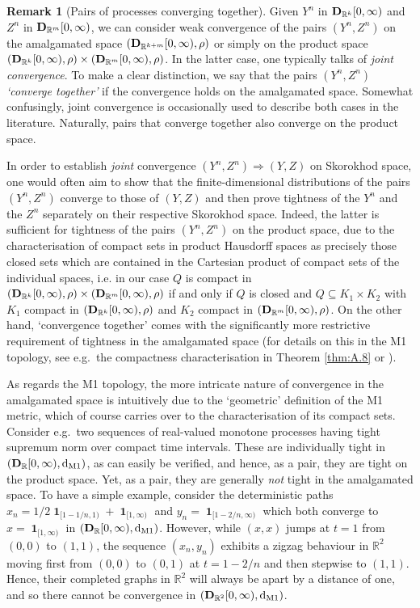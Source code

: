 \documentclass[11pt]{article}
\theoremstyle{definition}\newtheorem{example}[theorem]{Example}
\theoremstyle{definition}\newtheorem{counterexample}[theorem]{Counterexample}
\theoremstyle{definition}\newtheorem{remark}[theorem]{Remark}
\theoremstyle{definition}\newtheorem{defi}[theorem]{Definition}
\numberwithin{equation}{section}
\newcommand{\R}{\mathbb{R}}
\newcommand{\D}{{\bf D}}											%
\newcommand*\diff{\mathop{}\!\mathrm{d}}								%
\newcommand{\ind}{\operatorname{\mathbf{1}}}							%
\renewcommand{\|}{\; : \, \;}											%
\newcommand{\dM}{\diff_{\operatorname{M1}}}							%
\begin{document}
\begin{remark}[Pairs of processes converging together] Given $Y^n$ in $\D_{\mathbb{R}^k}[0,\infty) $ and $Z^n$ in $\D_{\mathbb{R}^m}[0,\infty)$, we can consider weak convergence of the pairs $(Y^n,Z^n)$ on the amalgamated space $(\D_{\mathbb{R}^{k+m}}[0,\infty),\rho)$ or simply on the product space $(\D_{\mathbb{R}^{k}}[0,\infty),\rho) \times (\D_{\mathbb{R}^{m}}[0,\infty),\rho)$. In the latter case, one typically talks of \emph{joint convergence}. To make a clear distinction, we say that the pairs $(Y^n,Z^n)$ \emph{`converge together'} if the convergence holds on the amalgamated space. Somewhat confusingly, joint convergence is occasionally used to describe both cases in the literature. Naturally, pairs that converge together also converge on the product space.
	
	
\end{remark}

In order to establish \emph{joint} convergence $(Y^n,Z^n) \Rightarrow (Y,Z)$ on Skorokhod space, one would often aim to show that the finite-dimensional distributions of the pairs $(Y^n,Z^n)$ converge to those of $(Y,Z)$ and then prove tightness of the $Y^n$ and the $Z^n$ separately on their respective Skorokhod space. Indeed, the latter is sufficient for tightness of the pairs $(Y^n, Z^n)$ on the product space, due to the characterisation of compact sets in product Hausdorff spaces as precisely those closed sets which are contained in the Cartesian product of compact sets of the individual spaces, i.e. in our case $Q$ is compact in $(\D_{\mathbb{R}^{k}}[0,\infty),\rho) \times (\D_{\mathbb{R}^{m}}[0,\infty),\rho)$ if and only if $Q$ is closed and $Q\subseteq K_1 \times K_2$ with $K_1$ compact in $(\D_{\mathbb{R}^{k}}[0,\infty),\rho)$ and $K_2$ compact in $(\D_{\mathbb{R}^{m}}[0,\infty),\rho)$. On the other hand, `convergence together' comes with the significantly more restrictive requirement of tightness in the amalgamated space (for details on this in the M1 topology, see e.g.~the compactness characterisation in Theorem \ref{thm:A.8} or \cite{whitt}).

As regards the M1 topology, the more intricate nature of convergence in the amalgamated space is intuitively due to the `geometric' definition of the M1 metric, which of course carries over to the characterisation of its compact sets. Consider e.g.~two sequences of real-valued monotone processes having tight supremum norm over compact time intervals. These are individually tight in $(\D_\R[0,\infty), \dM)$, as can easily be verified, and hence, as a pair, they are tight on the product space. Yet, as a pair, they are generally \emph{not} tight in the amalgamated space. To have a simple example, consider the deterministic paths $x_n=1/2\ind_{[1-1/n,1)}+ \ind_{[1,\infty)}$ and $y_n=\ind_{[1-2/n,\infty)}$ which both converge to $x=\ind_{[1,\infty)}$ in $(\D_{\R}[0,\infty), \dM)$. However, while $(x,x)$ jumps at $t=1$ from $(0,0)$ to $(1,1)$, the sequence $(x_n,y_n)$ exhibits a zigzag behaviour in $\R^2$ moving first from $(0,0)$ to $(0,1)$ at $t=1-2/n$ and then stepwise to $(1,1)$. Hence, their completed graphs in $\R^2$ will always be apart by a distance of one, and so there cannot be convergence in $(\D_{\R^2}[0,\infty), \dM)$.
\end{document}
